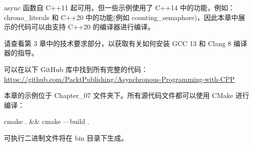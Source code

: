 async 函数自 C++11 起可用，但一些示例使用了 C++14 中的功能，例如： chrono\_literals 和 C++20 中的功能(例如 counting\_semaphore)，因此本章中展示的代码可以由支持 C++20 的编译器进行编译。

请查看第 3 章中的技术要求部分，以获取有关如何安装 GCC 13 和 Clang 8 编译器的指导。

可以在以下 GitHub 库中找到所有完整的代码： \url{https://github.com/PacktPublishing/Asynchronous-Programming-with-CPP}

本章的示例位于 Chapter\_07 文件夹下。所有源代码文件都可以使用 CMake 进行编译：

\begin{shell}
cmake . && cmake —build .
\end{shell}

可执行二进制文件将在 bin 目录下生成。